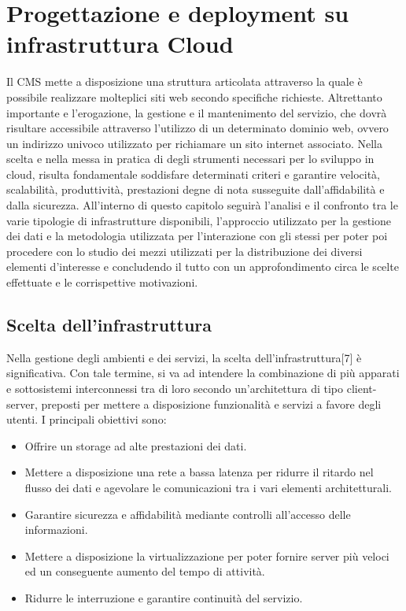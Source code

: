 \chapter{Progettazione e deployment su infrastruttura Cloud}
\label{chap:ProgettazioneCloud}
Il CMS mette a disposizione una struttura articolata attraverso la quale è possibile realizzare molteplici siti web secondo specifiche richieste.
Altrettanto importante e l'erogazione, la gestione e il mantenimento del servizio, che dovrà risultare accessibile attraverso l'utilizzo di un determinato dominio web, ovvero un indirizzo univoco utilizzato per richiamare un sito internet associato. \hfill \break
Nella scelta e nella messa in pratica di degli strumenti necessari per lo sviluppo in cloud, risulta fondamentale soddisfare determinati criteri e garantire velocità, scalabilità, produttività, prestazioni degne di nota susseguite dall'affidabilità e dalla sicurezza.
All'interno di questo capitolo seguirà l'analisi e il confronto tra le varie tipologie di infrastrutture disponibili, l'approccio utilizzato per la gestione dei dati e la metodologia utilizzata per l'interazione con gli stessi per poter poi procedere con lo studio dei mezzi utilizzati per la distribuzione dei diversi elementi d'interesse e concludendo il tutto con un approfondimento circa le scelte effettuate e le corrispettive motivazioni.

\section{Scelta dell'infrastruttura}
Nella gestione degli ambienti e dei servizi, la scelta dell'infrastruttura[7] è significativa. Con tale termine, si va ad intendere la combinazione di più apparati e sottosistemi interconnessi tra di loro secondo un'architettura di tipo client-server, preposti per mettere a disposizione funzionalità e servizi a favore degli utenti. I principali obiettivi sono:
\begin{itemize}
    \item Offrire un storage ad alte prestazioni dei dati.
    \item Mettere a disposizione una rete a bassa latenza per ridurre il ritardo nel flusso dei dati e agevolare le comunicazioni tra i vari elementi architetturali.
    \item Garantire sicurezza e affidabilità mediante controlli all'accesso delle informazioni.
    \item Mettere a disposizione la virtualizzazione per poter fornire server più veloci ed un conseguente aumento del tempo di attività.
    \item Ridurre le interruzione e garantire continuità del servizio.
\end{itemize}

